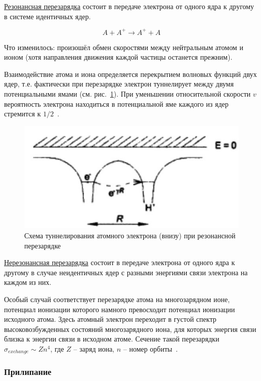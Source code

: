 \documentclass[10pt, a4paper]{article}
\numberwithin{equation}{section}
\begin{document}
\uline{Резонансная перезарядка} состоит в передаче электрона от одного ядра к другому в системе идентичных ядер.

\begin{equation*}
	A + A^{+} \rightarrow A^{+} + A
\end{equation*}

Что изменилось: произошёл обмен скоростями между нейтральным атомом и ионом (хотя направления движения каждой частицы останется прежним).

Взаимодействие атома и иона определяется перекрытием волновых функций двух ядер, т.е. фактически при перезарядке электрон туннелирует между двумя потенциальными ямами (см. рис.~\ref{fig:charge_exchange}). При уменьшении относительной скорости $v$ вероятность электрона находиться в потенциальной яме каждого из ядер стремится к $1/2$~\cite{astap}.

\begin{figure}[h!]
	\begin{center}
		\includegraphics[width=0.5\linewidth]{res_recharge.jpg}
	\end{center}
	\caption{Схема туннелирования атомного электрона (внизу) при резонансной перезарядке}
	\label{fig:charge_exchange}
\end{figure}

\uline{Нерезонансная перезарядка} состоит в передаче электрона от одного ядра к другому в случае неидентичных ядер с разными энергиями связи электрона на каждом из них.

Особый случай соответствует перезарядке атома на многозарядном ионе, потенциал ионизации которого намного превосходит потенциал ионизации исходного атома. Здесь атомный электрон переходит в густой спектр высоковозбужденных состояний многозарядного иона, для которых энергия связи близка к энергии связи в исходном атоме. Сечение такой перезарядки $\sigma_{exchange} \sim Zn^4$, где $Z$ -- заряд иона, $n$ -- номер орбиты~\cite{astap}.

\subsubsection{Прилипание}
\end{document}
